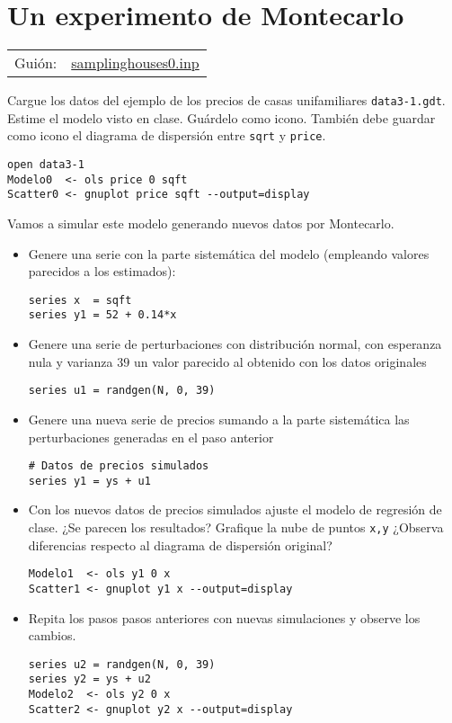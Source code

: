 \documentclass[11pt]{article}
\begin{document}
\section{Un experimento de Montecarlo}
\label{sec:org4039a16}
\begin{center}
\begin{tabular}{ll}
Guión: & \href{https://github.com/mbujosab/Ectr/tree/master/Practicas/Gretl/scripts/samplinghouses0.inp}{samplinghouses0.inp}\\[0pt]
\end{tabular}
\end{center}

Cargue los datos del ejemplo de los precios de casas unifamiliares
\texttt{data3-1.gdt}. Estime el modelo visto en clase. Guárdelo como
icono. También debe guardar como icono el diagrama de dispersión entre
\texttt{sqrt} y \texttt{price}.
\begin{verbatim}
open data3-1
Modelo0  <- ols price 0 sqft
Scatter0 <- gnuplot price sqft --output=display
\end{verbatim}

Vamos a simular este modelo generando nuevos datos por Montecarlo.

\begin{itemize}
\item Genere una serie con la parte sistemática del modelo (empleando
valores parecidos a los estimados):
\begin{verbatim}
series x  = sqft
series y1 = 52 + 0.14*x
\end{verbatim}

\item Genere una serie de perturbaciones con distribución normal, con
esperanza nula y varianza \(39\) un valor parecido al obtenido con los
datos originales
\begin{verbatim}
series u1 = randgen(N, 0, 39)
\end{verbatim}

\item Genere una nueva serie de precios sumando a la parte
sistemática las perturbaciones generadas en el paso anterior
\begin{verbatim}
# Datos de precios simulados
series y1 = ys + u1
\end{verbatim}

\item Con los nuevos datos de precios simulados ajuste el modelo de
regresión de clase. ¿Se parecen los resultados?  Grafique la nube de
puntos \texttt{x,y} ¿Observa diferencias respecto al diagrama de dispersión
original?
\begin{verbatim}
Modelo1  <- ols y1 0 x
Scatter1 <- gnuplot y1 x --output=display
\end{verbatim}

\item Repita los pasos pasos anteriores con nuevas simulaciones y observe
los cambios.
\begin{verbatim}
series u2 = randgen(N, 0, 39)
series y2 = ys + u2
Modelo2  <- ols y2 0 x
Scatter2 <- gnuplot y2 x --output=display
\end{verbatim}
\end{itemize}
\end{document}
